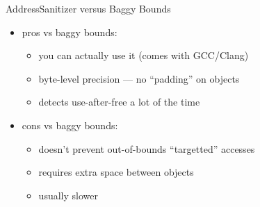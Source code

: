 
\begin{frame}{AddressSanitizer versus Baggy Bounds}
    \begin{itemize}
    \item pros vs baggy bounds:
        \begin{itemize}
        \item you can actually use it (comes with GCC/Clang)
        \item byte-level precision --- no ``padding'' on objects
        \item detects use-after-free a lot of the time
        \end{itemize}
    \item cons vs baggy bounds:
        \begin{itemize}
        \item doesn't prevent out-of-bounds ``targetted'' accesses
        \item requires extra space between objects
        \item usually slower
        \end{itemize}
    \end{itemize}
\end{frame}

